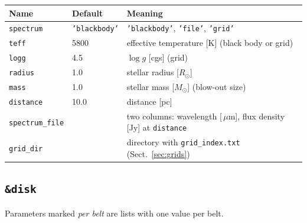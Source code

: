 \documentclass[11pt,a4paper]{article}
\newcommand{\code}[1]{\texttt{#1}}
\newcommand{\um}{\,$\mu$m}
\newcommand{\Msun}{M_\odot}
\begin{document}
\small
\begin{longtable}{@{}R{4.15cm}R{3.4cm}R{7.45cm}@{}}
\toprule
Name & Default & Meaning \\
\midrule
\endhead
\code{spectrum} & \code{'blackbody'} & \code{'blackbody'}, \code{'file'}, \code{'grid'} \\
\code{teff} & 5800 & effective temperature [K] (black body or grid) \\
\code{logg} & 4.5 & $\log g$ [cgs] (grid) \\
\code{radius} & 1.0 & stellar radius [$R_\odot$] \\
\code{mass} & 1.0 & stellar mass [$\Msun$] (blow-out size) \\
\code{distance} & 10.0 & distance [pc] \\
\code{spectrum\_file} & & two columns: wavelength [\um], flux density [Jy] at \code{distance} \\
\code{grid\_dir} & & directory with \code{grid\_index.txt} (Sect.~\ref{sec:grids}) \\
\bottomrule
\end{longtable}
\normalsize

\subsection{\code{\&disk}}

Parameters marked \emph{per belt} are lists with one value per belt.
\end{document}
